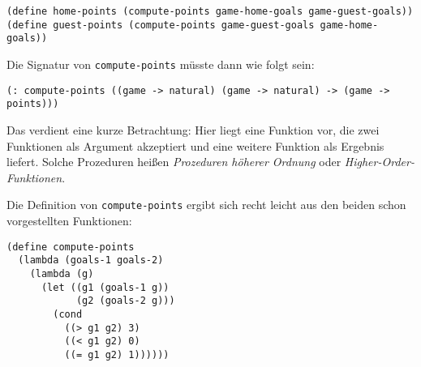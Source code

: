 \begin{verbatim}
(define home-points (compute-points game-home-goals game-guest-goals))
(define guest-points (compute-points game-guest-goals game-home-goals))
\end{verbatim}

Die Signatur von \texttt{compute-points} müsste dann wie folgt sein:
\begin{verbatim}
(: compute-points ((game -> natural) (game -> natural) -> (game -> points)))
\end{verbatim}
Das verdient eine kurze Betrachtung: Hier liegt eine Funktion vor, die zwei
Funktionen als Argument akzeptiert und eine weitere Funktion als Ergebnis
liefert. Solche Prozeduren heißen \textit{Prozeduren höherer Ordnung} oder
\textit{Higher-Order-Funktionen}. 

Die Definition von \texttt{compute-points} ergibt sich recht leicht aus den
beiden schon vorgestellten Funktionen:
\begin{verbatim}
(define compute-points
  (lambda (goals-1 goals-2)
    (lambda (g)
      (let ((g1 (goals-1 g))
            (g2 (goals-2 g)))
        (cond
          ((> g1 g2) 3)
          ((< g1 g2) 0)
          ((= g1 g2) 1))))))
\end{verbatim}

